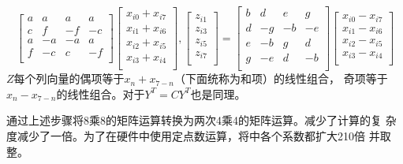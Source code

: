 \documentclass{article}
\numberwithin {equation}{section}
\begin{document}
\begin{spacing}{1.25}
\begin{equation}
\begin{bmatrix}
          a & a   & a   & a\\
          c & f   & -f  & -c\\
          a & -a  & -a  & a\\
          f & -c  & c   & -f\\
        \end{bmatrix}\begin{bmatrix}
          x_{i0}+x_{i7}\\
          x_{i1}+x_{i6}\\
          x_{i2}+x_{i5}\\
          x_{i3}+x_{i4}\\
        \end{bmatrix}, 
        \begin{bmatrix}
          z_{i1}\\z_{i3}\\z_{i5}\\z_{i7}\\
        \end{bmatrix}=\begin{bmatrix}
          b & d   & e   & g\\
          d & -g  & -b  & -e\\
          e & -b  & g   & d\\
          g & -e  & d   & -b\\
        \end{bmatrix}\begin{bmatrix}
          x_{i0}-x_{i7}\\
          x_{i1}-x_{i6}\\
          x_{i2}-x_{i5}\\
          x_{i3}-x_{i4}\\
        \end{bmatrix}
      \end{equation}
      $Z$每个列向量的偶项等于$x_{n}+x_{7-n}$（下面统称为和项）的线性组合，
      奇项等于$x_{n}-x_{7-n}$的线性组合。对于$Y^{T}=CY^{T}$也是同理。

      通过上述步骤将8乘8的矩阵运算转换为两次4乘4的矩阵运算。减少了计算的复
      杂度减少了一倍。为了在硬件中使用定点数运算，将中各个系数都扩大210倍
      并取整。


\end{spacing}
\end{document}
